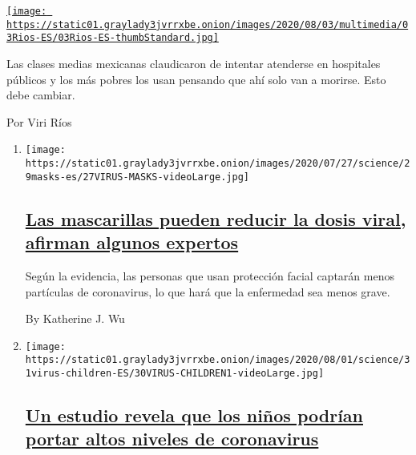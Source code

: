 \begin{enumerate}
\begin{enumerate}
    \href{/es/2020/08/03/espanol/opinion/servicio-salud-mexico.html}{\texttt{[image: https://static01.graylady3jvrrxbe.onion/images/2020/08/03/multimedia/03Rios-ES/03Rios-ES-thumbStandard.jpg]}}

    Las clases medias mexicanas claudicaron de intentar atenderse en
    hospitales públicos y los más pobres los usan pensando que ahí solo
    van a morirse. Esto debe cambiar.

    Por Viri Ríos
  \end{enumerate}
\end{enumerate}

\begin{enumerate}
\def\labelenumi{\arabic{enumi}.}
\item
  \texttt{[image: https://static01.graylady3jvrrxbe.onion/images/2020/07/27/science/29masks-es/27VIRUS-MASKS-videoLarge.jpg]}

  \hypertarget{las-mascarillas-pueden-reducir-la-dosis-viral-afirman-algunos-expertos}{%
  \subsection{\texorpdfstring{\href{/es/2020/07/29/espanol/ciencia-y-tecnologia/proteccion-cubrebocas-coronavirus.html}{Las
  mascarillas pueden reducir la dosis viral, afirman algunos
  expertos}}{Las mascarillas pueden reducir la dosis viral, afirman algunos expertos}}\label{las-mascarillas-pueden-reducir-la-dosis-viral-afirman-algunos-expertos}}

  Según la evidencia, las personas que usan protección facial captarán
  menos partículas de coronavirus, lo que hará que la enfermedad sea
  menos grave.

  By Katherine J. Wu
\item
  \texttt{[image: https://static01.graylady3jvrrxbe.onion/images/2020/08/01/science/31virus-children-ES/30VIRUS-CHILDREN1-videoLarge.jpg]}

  \hypertarget{un-estudio-revela-que-los-niuxf1os-podruxedan-portar-altos-niveles-de-coronavirus}{%
  \subsection{\texorpdfstring{\href{/es/2020/07/31/espanol/ciencia-y-tecnologia/ninos-contagio-coronavirus.html}{Un
  estudio revela que los niños podrían portar altos niveles de
  coronavirus}}{Un estudio revela que los niños podrían portar altos niveles de coronavirus}}\label{un-estudio-revela-que-los-niuxf1os-podruxedan-portar-altos-niveles-de-coronavirus}}


\end{enumerate}

